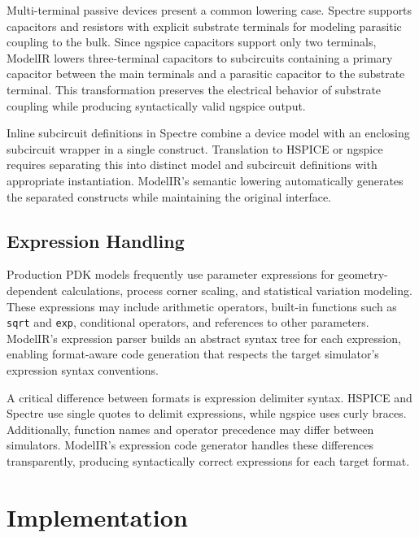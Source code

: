 \documentclass[conference]{IEEEtran}
\begin{document}
Multi-terminal passive devices present a common lowering case. Spectre supports capacitors and resistors with explicit substrate terminals for modeling parasitic coupling to the bulk. Since ngspice capacitors support only two terminals, ModelIR lowers three-terminal capacitors to subcircuits containing a primary capacitor between the main terminals and a parasitic capacitor to the substrate terminal. This transformation preserves the electrical behavior of substrate coupling while producing syntactically valid ngspice output.

Inline subcircuit definitions in Spectre combine a device model with an enclosing subcircuit wrapper in a single construct. Translation to HSPICE or ngspice requires separating this into distinct model and subcircuit definitions with appropriate instantiation. ModelIR's semantic lowering automatically generates the separated constructs while maintaining the original interface.

\subsection{Expression Handling}

Production PDK models frequently use parameter expressions for geometry-dependent calculations, process corner scaling, and statistical variation modeling. These expressions may include arithmetic operators, built-in functions such as \texttt{sqrt} and \texttt{exp}, conditional operators, and references to other parameters. ModelIR's expression parser builds an abstract syntax tree for each expression, enabling format-aware code generation that respects the target simulator's expression syntax conventions.

A critical difference between formats is expression delimiter syntax. HSPICE and Spectre use single quotes to delimit expressions, while ngspice uses curly braces. Additionally, function names and operator precedence may differ between simulators. ModelIR's expression code generator handles these differences transparently, producing syntactically correct expressions for each target format.

\section{Implementation}
\label{sec:implementation}
\end{document}
